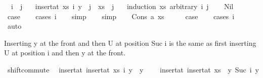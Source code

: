 \begin{isabellebody}
\ \ {\isachardoublequoteopen}i\ {\isacharless}{\kern0pt}\ j\ {\isacharequal}{\kern0pt}{\isacharequal}{\kern0pt}{\isachargreater}{\kern0pt}\isanewline
\ \ {\isacharparenleft}{\kern0pt}insert{\isacharunderscore}{\kern0pt}at\ xs\ i\ y{\isacharparenright}{\kern0pt}\ {\isacharbang}{\kern0pt}\ j\ {\isacharequal}{\kern0pt}\ xs\ {\isacharbang}{\kern0pt}\ {\isacharparenleft}{\kern0pt}j\ {\isacharminus}{\kern0pt}\ {}{\isacharparenright}{\kern0pt}{\isachardoublequoteclose}\isanewline
%
\isadelimproof
%
\endisadelimproof
%
\isatagproof
{}\isamarkupfalse%
\ {\isacharparenleft}{\kern0pt}induction\ xs\ arbitrary{\isacharcolon}{\kern0pt}\ i\ j{\isacharparenright}{\kern0pt}\isanewline
\ \ \isamarkupfalse%
\ Nil\isanewline
\ \ \isamarkupfalse%
\ \isamarkupfalse%
\ {\isacharquery}{\kern0pt}case\isanewline
\ \ \isamarkupfalse%
\ {\isacharparenleft}{\kern0pt}cases\ i{\isacharparenright}{\kern0pt}\isanewline
\ \ \isamarkupfalse%
\ simp\isanewline
\ \ \isamarkupfalse%
\ simp\isanewline
{}\isamarkupfalse%
\isanewline
\ \ \isamarkupfalse%
\ {\isacharparenleft}{\kern0pt}Cons\ a\ xs{\isacharparenright}{\kern0pt}\isanewline
\ \ \isamarkupfalse%
\ \isamarkupfalse%
\ {\isacharquery}{\kern0pt}case\isanewline
\ \ \isamarkupfalse%
\ {\isacharparenleft}{\kern0pt}cases\ i{\isacharparenright}{\kern0pt}\isanewline
\ \ \isamarkupfalse%
\ auto\isanewline
\ \ \isamarkupfalse%
\isanewline
{}\isamarkupfalse%
%
\endisatagproof
{\isafoldproof}%
%
\isadelimproof
%
\endisadelimproof
%
\begin{isamarkuptext}%
Inserting y at the front and then U at position Suc i is the same as
  first inserting U at position i and then y at the front.%
\end{isamarkuptext}\isamarkuptrue%
\isamarkupfalse%
\ shift{\isacharunderscore}{\kern0pt}commute{\isacharcolon}{\kern0pt}\isanewline
\ \ {\isachardoublequoteopen}insert{\isacharunderscore}{\kern0pt}at\ {\isacharparenleft}{\kern0pt}insert{\isacharunderscore}{\kern0pt}at\ xs\ i\ y{}{\isacharparenright}{\kern0pt}\ {}\ y{}\isanewline
\ \ \ {\isacharequal}{\kern0pt}\ insert{\isacharunderscore}{\kern0pt}at\ {\isacharparenleft}{\kern0pt}insert{\isacharunderscore}{\kern0pt}at\ xs\ {}\ y{}{\isacharparenright}{\kern0pt}\ {\isacharparenleft}{\kern0pt}Suc\ i{\isacharparenright}{\kern0pt}\ y{}{\isachardoublequoteclose}\isanewline

\end{isabellebody}
